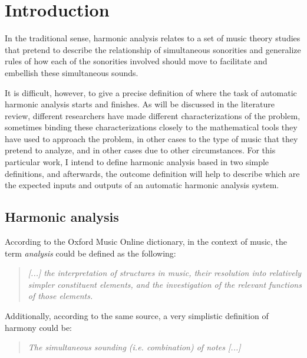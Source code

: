 \chapter{Introduction}
In the traditional sense, harmonic analysis relates to a set of music theory studies that pretend to describe the relationship of simultaneous sonorities and generalize rules of how each of the sonorities involved should move to facilitate and embellish these simultaneous sounds.

It is difficult, however, to give a precise definition of where the task of automatic harmonic analysis starts and finishes. As will be discussed in the literature review, different researchers have made different characterizations of the problem, sometimes binding these characterizations closely to the mathematical tools they have used to approach the problem, in other cases to the type of music that they pretend to analyze, and in other cases due to other circumstances. For this particular work, I intend to define harmonic analysis based in two simple definitions, and afterwards, the outcome definition will help to describe which are the expected inputs and outputs of an automatic harmonic analysis system.

\section{Harmonic analysis}
According to the Oxford Music Online dictionary, in the context of music, the term \emph{analysis} could be defined as the following: \cite{oxfordanalysis}

\begin{quote}
\centering
\emph{[...] the interpretation of structures in music, \linebreak
their resolution into relatively simpler constituent elements, \linebreak and the investigation of the relevant functions of those elements.}
\end{quote}

Additionally, according to the same source, a very simplistic definition of harmony could be: \cite{oxfordharmony}

\begin{quote}
\centering
\emph{The simultaneous sounding (i.e. combination) of notes [...]}
\end{quote}


